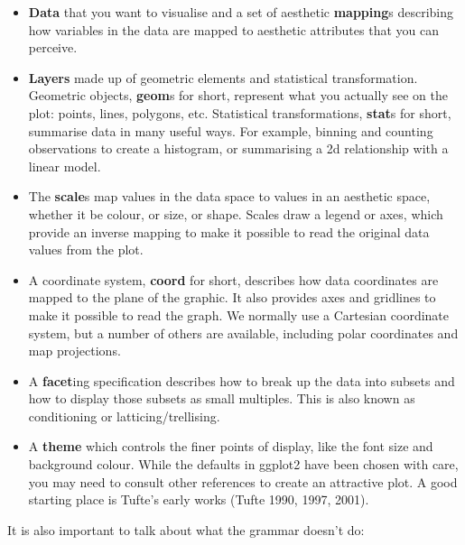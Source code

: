 \begin{itemize}
\item
  \textbf{Data} that you want to visualise and a set of aesthetic
  \textbf{mapping}s describing how variables in the data are mapped to
  aesthetic attributes that you can perceive.
\item
  \textbf{Layers} made up of geometric elements and statistical
  transformation. Geometric objects, \textbf{geom}s for short, represent
  what you actually see on the plot: points, lines, polygons, etc.
  Statistical transformations, \textbf{stat}s for short, summarise data
  in many useful ways. For example, binning and counting observations to
  create a histogram, or summarising a 2d relationship with a linear
  model.
\item
  The \textbf{scale}s map values in the data space to values in an
  aesthetic space, whether it be colour, or size, or shape. Scales draw
  a legend or axes, which provide an inverse mapping to make it possible
  to read the original data values from the plot.
\item
  A coordinate system, \textbf{coord} for short, describes how data
  coordinates are mapped to the plane of the graphic. It also provides
  axes and gridlines to make it possible to read the graph. We normally
  use a Cartesian coordinate system, but a number of others are
  available, including polar coordinates and map projections.
\item
  A \textbf{facet}ing specification describes how to break up the data
  into subsets and how to display those subsets as small multiples. This
  is also known as conditioning or latticing/trellising.
\item
  A \textbf{theme} which controls the finer points of display, like the
  font size and background colour. While the defaults in ggplot2 have
  been chosen with care, you may need to consult other references to
  create an attractive plot. A good starting place is Tufte's early
  works (Tufte 1990, 1997, 2001).
\end{itemize}

It is also important to talk about what the grammar doesn't do:

